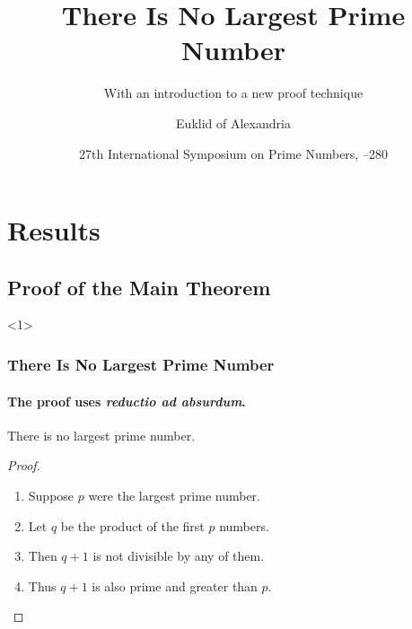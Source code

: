 
\beamertemplatetransparentcovered

\title{There Is No Largest Prime Number}
\subtitle{With an introduction to a new proof technique}

\author[Euklid]{Euklid of Alexandria}
\date[ISPN '80]{27th International Symposium on Prime Numbers, --280}



\begin{frame}
  \titlepage
  \tableofcontents
\end{frame}

\section{Results}
\subsection{Proof of the Main Theorem}

\begin{frame}<1>
  \frametitle{There Is No Largest Prime Number}
  \framesubtitle{The proof uses \textit{reductio ad absurdum}.}

  \begin{theorem}
    There is no largest prime number.
  \end{theorem}
  \begin{proof}
    \begin{enumerate}
    \item<1-| alert@1> Suppose $p$ were the largest prime number.
    \item<2-> Let $q$ be the product of the first $p$ numbers.
    \item<3-> Then $q+1$ is not divisible by any of them.
    \item<1-> Thus $q+1$ is also prime and greater than $p$.\qedhere
    \end{enumerate}
  \end{proof}
\end{frame}


